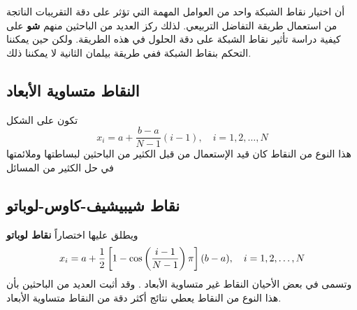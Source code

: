 أن اختيار نقاط الشبكة واحد من العوامل المهمة التي تؤثر على دقة التقريبات الناتجة من استعمال طريقة التفاضل التربيعي. لذلك ركز العديد من الباحثين منهم \textbf{شو } على كيفية دراسة تأثير نقاط الشبكة على دقة الحلول في هذه الطريقة. ولكن حين يمكننا التحكم بنقاط الشبكة ففي طريقة بيلمان الثانية لا يمكننا ذلك.

\subsection[النقاط متساوية الأبعاد]{النقاط متساوية الأبعاد }
تكون على الشكل
\begin{equation}
	\label{eq:equally_spaced_points}
	x_i=a+\frac{b-a}{N-1}(i-1),\quad i=1,2,\dots,N
\end{equation}
هذا النوع من النقاط كان قيد الإستعمال من قبل الكثير من الباحثين لبساطتها وملائمتها في حل الكثير من المسائل

\subsection[نقاط شيبيشيف-كاوس-لوباتو]{نقاط شيبيشيف-كاوس-لوباتو }
ويطلق عليها اختصاراً \textbf{نقاط لوباتو }
\begin{equation}
	\label{eq:lobatto-points}
	x_i=a+\frac{1}{2}\left[1-\cos\left(\frac{i-1}{N-1}\right)\pi\right](b-a),\quad i=1,2,\dots,N
\end{equation}
وتسمى في بعض الأحيان النقاط غير متساوية الأبعاد . وقد أثبت العديد من الباحثين بأن هذا النوع من النقاط يعطي نتائج أكثر دقة من النقاط متساوية الأبعاد.




